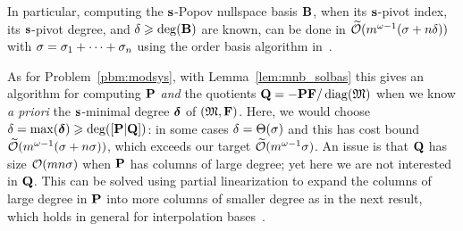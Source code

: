 \documentclass[preprint]{sig-alternate-05-2015}
\begin{document}
\vspace{-0.2cm}
In particular, computing the $\shifts[s]$-Popov nullspace basis $\mat{B}$, when
its $\shifts$-pivot index, its $\shifts$-pivot degree, and
$\maxDeg\ge\deg(\mat{B})$ are known, can be done in $\softO{\rdim^{\expmatmul-1}
(\order + \cdim\maxDeg)}$ with $\order = \order_1 + \cdots + \order_\cdim$
using the order basis algorithm in~\cite{JeNeScVi16}.

As for Problem~\ref{pbm:modsys}, with Lemma~\ref{lem:mnb_solbas} this gives an
algorithm for computing $\msb$ \emph{and} the quotients $\mat{Q} = -\msb \sys /
\diag{\Modulus}$ when we know \emph{a priori} the $\shifts$-minimal degree
$\minDegs$ of $(\Modulus,\sys)$. Here, we would choose $\maxDeg =
\max(\minDegs) \ge \deg( [\msb | \mat{Q}])$: in some cases $\maxDeg =
\Theta(\degMod)$ and this has cost bound $\softO{\nbun^{\expmatmul-1} (\degMod
+ \nbeq \degMod)}$, which exceeds our target $\softO{\nbun^{\expmatmul-1}
\degMod}$. An issue is that $\mat{Q}$ has size $\bigO{\nbun \nbeq \degMod}$
when $\msb$ has columns of large degree; yet here we are not interested in
$\mat{Q}$. This can be solved using partial linearization to expand the columns
of large degree in $\msb$ into more columns of smaller degree as in the next
result, which holds in general for interpolation
bases~\cite[Lemma~4.2]{JeNeScVi16}.
\end{document}
